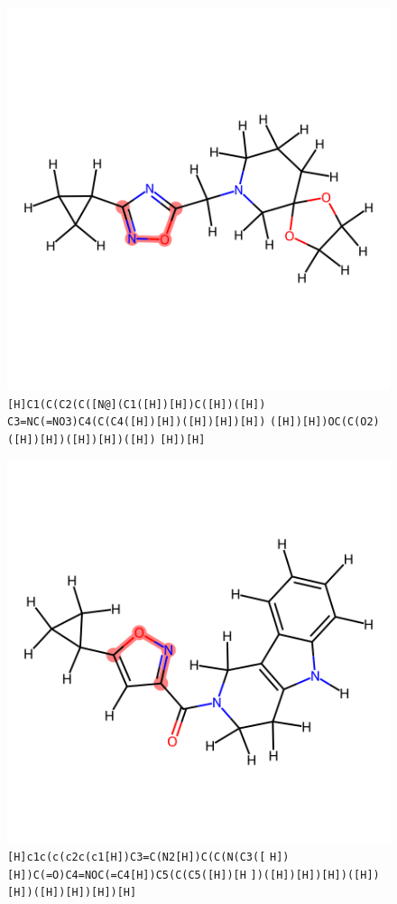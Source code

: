 \documentclass{article}
\begin{document}
\begin{figure}[ht]
\centering
    \includegraphics{mol06.png}
\cprotect\caption{\verb|[H]C1(C(C2(C([N@](C1([H])[H])C([H])([H])| \verb|C3=NC(=NO3)C4(C(C4([H])[H])([H])[H])[H])| \verb|([H])[H])OC(C(O2)([H])[H])([H])[H])([H])| \verb|[H])[H]| }
\end{figure}

\begin{figure}[ht]
\centering
    \includegraphics{mol07.png}
\cprotect\caption{\verb|[H]c1c(c(c2c(c1[H])C3=C(N2[H])C(C(N(C3([| \verb|H])[H])C(=O)C4=NOC(=C4[H])C5(C(C5([H])[H| \verb|])([H])[H])[H])([H])[H])([H])[H])[H])[H]| }
\end{figure}
\end{document}
